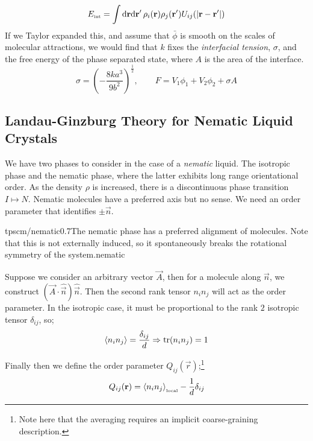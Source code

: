 \begin{equation}
E_{\text{\tiny{int}}} = \int{\ud \vec{r} \upd{\vec{r}\pr} \rho_i(\vec r) \rho_j(\vec{r}\pr)U_{ij}(\abs{\vec{r} - \vec{r}\pr})}
\end{equation}
If we Taylor expanded this, and assume that $\bar{\phi}$ is smooth on the scales of molecular attractions, we would find that $k$ fixes the \emph{interfacial tension}, $\sigma$, and the free energy of the phase separated state, where $A$ is the area of the interface.
\begin{equation}
\sigma = \left(-\frac{8ka^3}{9b^2}\right)^{\tfrac{1}{2}}, \qquad F = V_1 \phi_1 + V_2 \phi_2 + \sigma A
\end{equation}
\subsection{Landau-Ginzburg Theory for Nematic Liquid Crystals} 
We have two phases to consider in the case of a \emph{nematic} liquid. The isotropic phase and the nematic phase, where the latter exhibits long range orientational order. As the density $\rho$ is increased, there is a discontinuous phase transition $I \mapsto N$. Nematic molecules have a preferred axis but no sense. We need an order parameter that identifies $\pm \vec n$. 
\begin{mygraphic}{tpscm/nematic}{0.7}{The nematic phase has a preferred alignment of molecules. Note that this is not externally induced, so it spontaneously breaks the rotational symmetry of the system.}{nematic}\end{mygraphic}
Suppose we consider an arbitrary vector $\vec A$, then for a molecule along $\hat{\vec{n}}$, we construct $(\vec A \cdot \hat{\vec n})\hat{\vec n}$. Then the second rank tensor $n_i n_j$ will act as the order parameter. In the isotropic case, it must be proportional to the rank $2$ isotropic tensor $\delta_{ij}$, so;
\begin{equation}
\left< n_i n_j \right> = \frac{\delta_{ij}}{d} \Rightarrow \tr(n_i n_j) = 1
\end{equation}
\begin{definitionbox}
Finally then we define the order parameter $Q_{ij}(\vec r)$;\footnote{Note here that the averaging requires an implicit coarse-graining description.}
\begin{equation}
Q_{ij}(\vec r) = \left< n_i n_j \right>_{\text{\tiny{local}}} - \frac{1}{d}\delta_{ij}
\end{equation}
\end{definitionbox}
